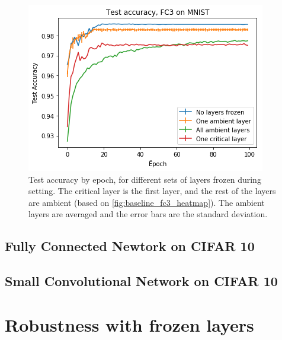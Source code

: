 \documentclass{article}
\begin{document}
\begin{figure}
  \includegraphics[width=\linewidth]{images/fc3_mnist_training_plots.png}
  \caption{Test accuracy by epoch, for different sets of layers frozen during setting. The critical layer is the first layer, and the rest of the layers are ambient (based on \ref{fig:baseline_fc3_heatmap}). The ambient layers are averaged and the error bars are the standard deviation.}
  \label{fig:fc3_training}
\end{figure}
\subsection{Fully Connected Newtork on CIFAR 10}
\subsection{Small Convolutional Network on CIFAR 10}
\section{Robustness with frozen layers} \label{freezingRobustness}
\end{document}
